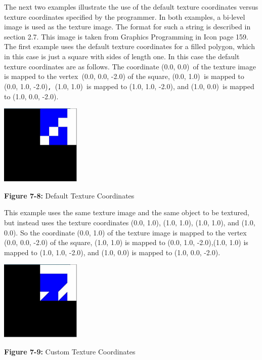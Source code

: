 The next two examples illustrate the use of the default texture
coordinates versus texture coordinates specified by the programmer. In
both examples, a bi-level image is used as the texture image. The
format for such a string is described in section 2.7. This image is
taken from Graphics Programming in Icon page 159. The first example
uses the default texture coordinates for a filled polygon, which in
this case is just a square with sides of length one. In this case the
default texture coordinates are as follows. The coordinate (0.0,
0.0)\texttt{ }of the texture image is mapped to the vertex\texttt{
}(0.0, 0.0, -2.0) of the square, (0.0, 1.0)\texttt{ }is mapped to (0.0,
1.0, -2.0)\texttt{, }(1.0, 1.0)\texttt{ }is mapped to (1.0, 1.0, -2.0),
and (1.0, 0.0)\texttt{ }is mapped to (1.0, 0.0, -2.0).

\begin{center}
{\includegraphics[width=1.5in,height=1.5in]{ub-img/ub-img39.jpg}}

{\sffamily\bfseries Figure 7-8:}
{\sffamily Default Texture Coordinates}
\end{center}


This example uses the same texture image and the same object to be
textured, but instead uses the texture coordinates (0.0, 1.0), (1.0,
1.0), (1.0, 1.0), and (1.0, 0.0). So the coordinate (0.0, 1.0) of the
texture image is mapped to the vertex (0.0, 0.0, -2.0) of the square,
(1.0, 1.0) is mapped to (0.0, 1.0, -2.0),(1.0, 1.0) is mapped to (1.0,
1.0, -2.0), and (1.0, 0.0) is mapped to (1.0, 0.0, -2.0).

\begin{center}
{
\includegraphics[width=1.5in,height=1.5in]{ub-img/ub-img40.jpg}}

{\sffamily\bfseries Figure 7-9:}
{\sffamily Custom Texture Coordinates}
\end{center}


